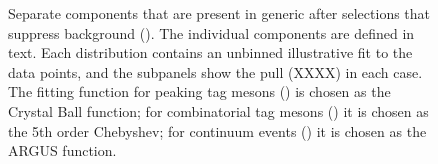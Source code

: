 \begin{figure}[htbp!]
    \caption{\label{fig:tag_component_fits} Separate components that are present in generic \MC after selections that suppress background ().
    The individual components are defined in  text.
    Each distribution contains an unbinned illustrative fit to the data points, and the subpanels show the pull (XXXX) in each case.
    The fitting function for peaking tag \B mesons () is chosen as the Crystal Ball function;
    for combinatorial tag \B mesons () it is chosen as the 5th order Chebyshev;
    for continuum \epem\ra\qqbar events () it is chosen as the ARGUS function.
    }
\end{figure}
